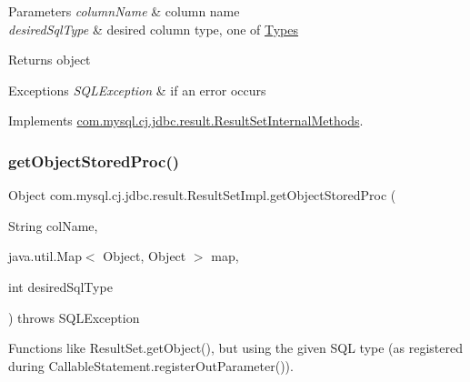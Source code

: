 \begin{DoxyParams}{Parameters}
{\em column\+Name} & column name \\
\hline
{\em desired\+Sql\+Type} & desired column type, one of \mbox{\hyperlink{}{Types}} \\
\hline
\end{DoxyParams}
\begin{DoxyReturn}{Returns}
object 
\end{DoxyReturn}

\begin{DoxyExceptions}{Exceptions}
{\em S\+Q\+L\+Exception} & if an error occurs \\
\hline
\end{DoxyExceptions}


Implements \mbox{\hyperlink{interfacecom_1_1mysql_1_1cj_1_1jdbc_1_1result_1_1_result_set_internal_methods_a403c7181f28d44398e8ba4865edf8fb0}{com.\+mysql.\+cj.\+jdbc.\+result.\+Result\+Set\+Internal\+Methods}}.

\mbox{\label{classcom_1_1mysql_1_1cj_1_1jdbc_1_1result_1_1_result_set_impl_aa9d0a1c264c70954b3fbc1f81f0e7a9b}} 
\subsubsection{\texorpdfstring{get\+Object\+Stored\+Proc()}{getObjectStoredProc()}\hspace{0.1cm}{\footnotesize\ttfamily [4/4]}}
{\footnotesize\ttfamily Object com.\+mysql.\+cj.\+jdbc.\+result.\+Result\+Set\+Impl.\+get\+Object\+Stored\+Proc (\begin{DoxyParamCaption}\item[{String}]{col\+Name,  }\item[{java.\+util.\+Map$<$ Object, Object $>$}]{map,  }\item[{int}]{desired\+Sql\+Type }\end{DoxyParamCaption}) throws S\+Q\+L\+Exception}

Functions like Result\+Set.\+get\+Object(), but using the given S\+QL type (as registered during Callable\+Statement.\+register\+Out\+Parameter()).


